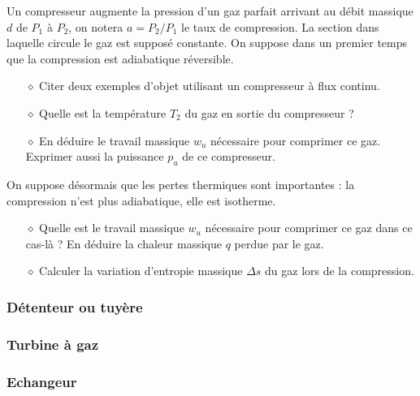 \documentclass{report}
\begin{document}
Un compresseur augmente la pression d'un gaz parfait arrivant au débit massique $d$ de $P_1$ à $P_2$, on notera $a=P_2/P_1$ le taux de compression. La section dans laquelle circule le gaz est supposé constante. On suppose dans un premier temps que la compression est adiabatique réversible.

\begin{itemize}

	\item[$\diamond$] Citer deux exemples d'objet utilisant un compresseur à flux continu.
	
	\item[$\diamond$] Quelle est la température $T_2$ du gaz en sortie du compresseur ?
	
	\item[$\diamond$] En déduire le travail massique $w_u$ nécessaire pour comprimer ce gaz. Exprimer aussi la puissance $p_u$ de ce compresseur.

\end{itemize}

On suppose désormais que les pertes thermiques sont importantes : la compression n'est plus adiabatique, elle est isotherme. 

\begin{itemize}

	\item[$\diamond$] Quelle est le travail massique $w_u$ nécessaire pour comprimer ce gaz dans ce cas-là ? En déduire la chaleur massique $q$ perdue par le gaz. 
	
	\item[$\diamond$] Calculer la variation d'entropie massique $\Delta s$ du gaz lors de la compression.
	
\end{itemize}

\subsubsection*{Détenteur ou tuyère}

\subsubsection*{Turbine à gaz}

\subsubsection*{Echangeur}

\newpage
\end{document}

